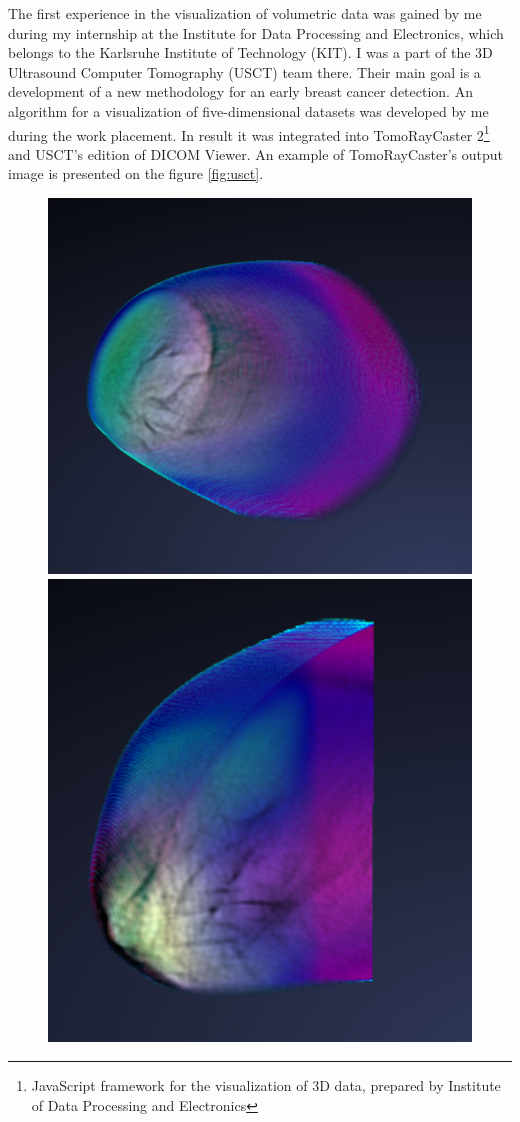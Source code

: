 \documentclass[twoside, english, 11pt]{report}
\begin{document}
The first experience in the visualization of volumetric data was gained by me during my internship at the Institute for Data Processing and Electronics, which belongs to the Karlsruhe Institute of Technology (KIT). I was a part of the 3D Ultrasound Computer Tomography (USCT) team there. Their main goal is a development of a new methodology for an early breast cancer detection. An algorithm for a visualization of five-dimensional datasets was developed by me during the work placement. In result it was integrated into TomoRayCaster 2\footnote{JavaScript framework for the visualization of 3D data, prepared by Institute of Data Processing and Electronics} and USCT's edition of DICOM Viewer. An example of TomoRayCaster's output image is presented on the figure \ref{fig:usct}.\\

\begin{figure}[!h]
\includegraphics[scale=0.4]{img/usct1}\includegraphics[scale=0.4335]{img/usct2}\\

\end{figure}
\end{document}
